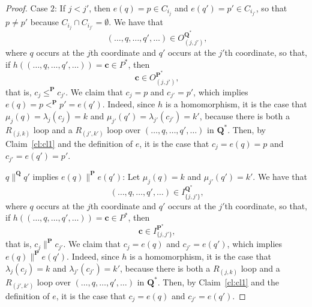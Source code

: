 \documentclass[usletter]{article}
\newcommand{\cc}{\mathbf{C}}
\newcommand{\dd}{\mathbf{D}}
\newcommand{\pp}{\mathbf{P}}
\newcommand{\qq}{\mathbf{Q}}
\newtheorem{example}{Example}
\begin{document}
{\begin{proof}
Case $2$:  If $j<j'$, then $e(q)=p \in C_{i_j}$ and $e(q')=p' \in C_{i_{j'}}$, so that $p \neq p'$ 
because $C_{i_j} \cap C_{i_{j'}}=\emptyset$.  We have that 
$$(\ldots,q,\ldots,q',\ldots) \in O_{(j,j')}^{\qq^*}\text{,}$$
where $q$ occurs at the $j$th coordinate and $q'$ occurs at the $j'$th coordinate, 
so that, if $h((\ldots,q,\ldots,q',\ldots))=\mathbf{c} \in P^*$, then  
$$\mathbf{c} \in O_{(j,j')}^{\pp^*}\text{,}$$
that is, $c_j \leq^{\pp} c_{j'}$.  We claim that $c_j=p$ and $c_{j'}=p'$, 
which implies $e(q)=p <^{\pp} p'=e(q')$.  
Indeed, since $h$ is a homomorphism, it is the case that $\mu_j(q)=\lambda_j(c_j)=k$ 
and $\mu_{j'}(q')=\lambda_{j'}(c_{j'})=k'$, because 
there is both a $R_{(j,k)}$ loop and a $R_{(j',k')}$ loop over $(\ldots,q,\ldots,q',\ldots)$ in $\qq^*$.  
Then, by Claim~\ref{cl:cl1} and the definition of $e$, it is the case that $c_j=e(q)=p$ 
and $c_{j'}=e(q')=p'$.

$q \parallel^\qq q'$ implies $e(q) \parallel^\pp e(q')$:  Let $\mu_j(q)=k$ and $\mu_{j'}(q')=k'$.  
We have that 
$$(\ldots,q,\ldots,q',\ldots) \in I_{\{j,j'\}}^{\qq^*}\text{,}$$
where $q$ occurs at the $j$th coordinate and $q'$ occurs at the $j'$th coordinate, 
so that, if $h((\ldots,q,\ldots,q',\ldots))=\mathbf{c} \in P^*$, then  
$$\mathbf{c} \in I_{\{j,j'\}}^{\pp^*}\text{,}$$
that is, $c_j\parallel^{\pp} c_{j'}$.  We claim that $c_j=e(q)$ and $c_{j'}=e(q')$, 
which implies $e(q) \parallel^{\pp} e(q')$.  
Indeed, since $h$ is a homomorphism, it is the case that $\lambda_j(c_j)=k$ 
and $\lambda_{j'}(c_{j'})=k'$, because 
there is both a $R_{(j,k)}$ loop and a $R_{(j',k')}$ loop over $(\ldots,q,\ldots,q',\ldots)$ in $\qq^*$.  
Then, by Claim~\ref{cl:cl1} and the definition of $e$, it is the case that $c_j=e(q)$ 
and $c_{j'}=e(q')$.
\end{proof}}

\newcommand{\excompilhom}[0]{
\begin{example}\label{ex:compilhom}
Let $\qq$ and $\pp$ be the posets in Example~\ref{ex:chainpartition}, 
so that $\qq$ embeds into $\pp$ via the map $e \colon Q \to P$ defined 
in the example (see Figure~\ref{fig:chainpartition}).  Let 
$\qq^*=\textup{compil}(\qq,\dd_{1},\dd_{2},\mu_1,\mu_{2})$ 
and $\pp^*=\textup{compil}(\pp,\cc_{1},\cc_{2},\lambda_1,\lambda_{2})$ 
be the structures in Example~\ref{ex:compilp}, respectively compiling $\qq$ and $\pp$.  
The homomorphism $h \colon Q^* \to P^*$, corresponding to the embedding $e \colon Q \to P$ as by (the forward direction of) 
Lemma~\ref{lemma:correct}, 
is depicted in Figure~\ref{fig:compilhom}.

\begin{figure}[h]
\centering
\texttt{[image: compilhom]}
\caption{The structures $\qq^*$ (left) and $\pp^*$ (right) in Example~\ref{ex:compilhom}.  
The white points in $P^*$ form the image of the homomorphism $h \colon Q^* \to P^*$ in Example~\ref{ex:compilhom}.  
It is possible to check that $h$ is a homomorphism by direct inspection of Figure~\ref{fig:compilq} and Figure~\ref{fig:compilp}.}
\label{fig:compilhom}
\end{figure}  
\end{example}}
\end{document}
